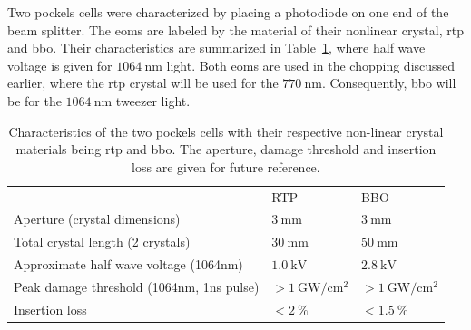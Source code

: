 \begin{figure}[t]%
\label{fig:eom_setup}
\end{figure}

Two  pockels cells were characterized by placing a photodiode on one end of the beam splitter. The \acp{eom} are labeled by the material of their nonlinear crystal, \ac{rtp} and \ac{bbo}. Their characteristics are summarized in Table~\ref{tbl:eom_crystals}, where half wave voltage is given for $\SI{1064}{\nano\meter}$ light. Both \acp{eom} are used in the chopping discussed earlier, where the \ac{rtp} crystal will be used for the $\SI{770}{\nano\meter}$. Consequently, \ac{bbo} will be for the $\SI{1064}{\nano\meter}$ tweezer light.

\begin{table}%
\label{tbl:eom_crystals}
\centering
\begin{tabular}{p{6cm} l l}
	\toprule \toprule
                                                                                     & RTP                                       & BBO \\ \thickhline%
Aperture (crystal dimensions)                                                        & $\SI{3}{\milli\meter}$                    & $\SI{3}{\milli\meter}$   \\ \midrule
Total crystal length (2 crystals)                                                    & $\SI{30}{\milli\meter}$                   & $\SI{50}{\milli\meter}$    \\ \midrule
Approximate half wave voltage \newline (1064nm)    & $\SI{1.0}{\kilo \volt}$                   & $\SI{2.8}{\kilo\volt}$    \\ \midrule
Peak damage threshold (1064nm, \newline 1ns pulse) & $> \SI{1}{\giga \watt \per \cm \squared}$ & $> \SI{1}{\giga \watt \per \cm \squared}$   \\ \midrule
Insertion loss                                                                       & $< \SI{2}{\percent}$                      & $< \SI{1.5}{\percent} $ \\ \bottomrule \bottomrule
\end{tabular}
\caption{Characteristics of the two pockels cells with their respective non-linear crystal materials being \ac{rtp} and \ac{bbo}. The aperture, damage threshold and insertion loss are given for future reference.}
\end{table}


